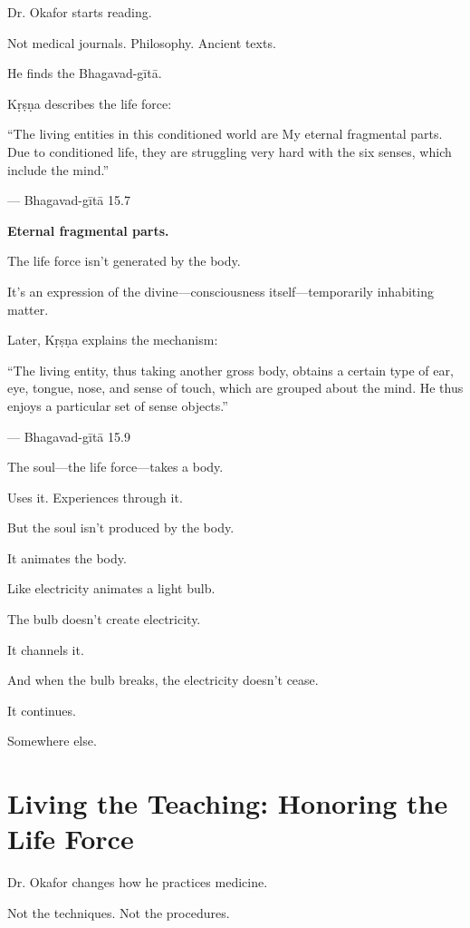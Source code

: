 \documentclass[11pt,twoside]{book}
\begin{document}
Dr. Okafor starts reading.

Not medical journals. Philosophy. Ancient texts.

He finds the Bhagavad-gītā.

Kṛṣṇa describes the life force:

\begin{pullquote}
``The living entities in this conditioned world are My eternal fragmental parts. Due to conditioned life, they are struggling very hard with the six senses, which include the mind.''

--- Bhagavad-gītā 15.7
\end{pullquote}

\textbf{Eternal fragmental parts.}

The life force isn't generated by the body.

It's an expression of the divine—consciousness itself—temporarily inhabiting matter.

Later, Kṛṣṇa explains the mechanism:

\begin{pullquote}
``The living entity, thus taking another gross body, obtains a certain type of ear, eye, tongue, nose, and sense of touch, which are grouped about the mind. He thus enjoys a particular set of sense objects.''

--- Bhagavad-gītā 15.9
\end{pullquote}

The soul—the life force—takes a body.

Uses it. Experiences through it.

But the soul isn't produced by the body.

It animates the body.

Like electricity animates a light bulb.

The bulb doesn't create electricity.

It channels it.

And when the bulb breaks, the electricity doesn't cease.

It continues.

Somewhere else.

\section*{Living the Teaching: Honoring the Life Force}

Dr. Okafor changes how he practices medicine.

Not the techniques. Not the procedures.
\end{document}
